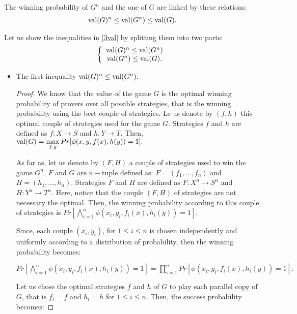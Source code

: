 The winning probability of $G^n$ and the one of $G$ are linked by these relations: \begin{align} \mathrm{val} (G)^n \leq \mathrm{val} (G^n) \leq \mathrm{val} (G). \label{3val}\end{align}

Let us show the inequalities in \eqref{3val} by splitting them into two parts: 
\begin{align}
\left\lbrace \begin{array}{c} \mathrm{val} (G)^n \leq \mathrm{val} (G^n) \\ \mathrm{val} (G^n) \leq \mathrm{val} (G).  \end{array}\right.
\end{align}

\begin{itemize}
\item The first inequality $\mathrm{val} (G)^n \leq \mathrm{val} (G^n) .$

\begin{proof}
We know that the value of the game $G$ is the optimal winning probability of provers over all possible strategies, that is the winning probability using the best couple of strategies. Le us denote by $(f,h)$ this optimal couple of strategies used for the game $G$. Strategies $f$ and $h$ are  defined as $f: X\longrightarrow S$ and  $h: Y\longrightarrow T.$  Then, $\mathrm{val} (G)= \max\limits_{f,g} Pr[\phi(x,y,f(x),h(y))=1].$

As far as, let us denote by $(F,H)$ a couple of strategies  used  to win the game $G^n$. $F$ and $G$ are $n-$tuple defined as: $F=(f_1, \ldots, f_n)$ and  $H=(h_1, \ldots, h_n)$. Strategies $F$ and $H$ are  defined as $F: X^n\longrightarrow S^n$ and  $H: Y^n\longrightarrow T^n.$ Here, notice that the couple $(F,H)$ of strategies are not necessary the optimal.
Then, the winning probability according to this couple of strategies is $Pr \left[\bigwedge\limits_{i=1}^n \phi (x_i,y_i, f_i(\bar{x}), h_i(\bar{y}))=1 \right].$

Since, each couple $(x_i,y_i)$, for $ 1\leq i \leq n$ is chosen independently and uniformly according to a distribution of probability, then the winning probability becomes: 

$Pr \left[\bigwedge\limits_{i=1}^n \phi (x_i,y_i, f_i(\bar{x}), h_i(\bar{y}))=1 \right]= \prod\limits_{i=1}^n Pr \left[ \phi (x_i,y_i, f_i(\bar{x}), h_i(\bar{y}))=1 \right].$

Let us chose the optimal strategies $f$ and $h$ of $G$ to play each parallel copy of $G$, that is $f_i=f$ and $h_i=h$ for $ 1\leq i \leq n$. Then, the success probability becomes:


\end{proof}
\end{itemize}

